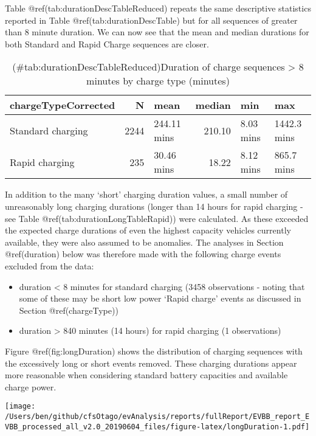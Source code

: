 \documentclass[]{article}
\providecommand{\tightlist}{%
  \setlength{\itemsep}{0pt}\setlength{\parskip}{0pt}}
\begin{document}
Table @ref(tab:durationDescTableReduced) repeats the same descriptive statistics reported in Table @ref(tab:durationDescTable) but for all sequences of greater than 8 minute duration. We can now see that the mean and median durations for both Standard and Rapid Charge sequences are closer.

\begin{table}[t]

\caption{(\#tab:durationDescTableReduced)Duration of charge sequences > 8 minutes by charge type (minutes)}
\centering
\begin{tabular}{l|r|l|r|l|l}
\hline
chargeTypeCorrected & N & mean & median & min & max\\
\hline
Standard charging & 2244 & 244.11 mins & 210.10 & 8.03 mins & 1442.3 mins\\
\hline
Rapid charging & 235 & 30.46 mins & 18.22 & 8.12 mins & 865.7 mins\\
\hline
\end{tabular}
\end{table}

In addition to the many `short' charging duration values, a small number of unreasonably long charging durations (longer than 14 hours for rapid charging - see Table @ref(tab:durationLongTableRapid)) were calculated. As these exceeded the expected charge durations of even the highest capacity vehicles currently available, they were also assumed to be anomalies. The analyses in Section @ref(duration) below was therefore made with the following charge events excluded from the data:

\begin{itemize}
\tightlist
\item
  duration \textless{} 8 minutes for standard charging (3458 observations - noting that some of these may be short low power `Rapid charge' events as discussed in Section @ref(chargeType))
\item
  duration \textgreater{} 840 minutes (14 hours) for rapid charging (1 observations)
\end{itemize}

Figure @ref(fig:longDuration) shows the distribution of charging sequences with the excessively long or short events removed. These charging durations appear more reasonable when considering standard battery capacities and available charge power.

\texttt{[image: /Users/ben/github/cfsOtago/evAnalysis/reports/fullReport/EVBB\_report\_EVBB\_processed\_all\_v2.0\_20190604\_files/figure-latex/longDuration-1.pdf]}
\end{document}
